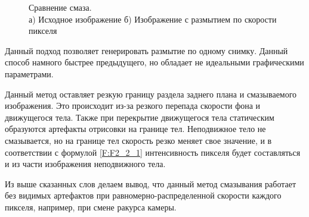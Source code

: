 \begin{figure}
    \centering
    \begin{minipage}[h]{0.49\linewidth}
    \end{minipage}
    \hfill
    \begin{minipage}[h]{0.49\linewidth}
    \end{minipage}
    \caption{Сравнение смаза. \cite{jimenez2014next} \\ а) Исходное изображение б) Изображение с размытием по скорости пикселя}
    \label{fig:pixel_blur}
\end{figure}


Данный подход позволяет генерировать размытие по одному снимку. Данный способ намного быстрее предыдущего, но обладает не идеальными графическими параметрами.
\par
Данный метод оставляет резкую границу раздела заднего плана и смазываемого изображения. Это происходит из-за резкого перепада скорости фона и движущегося тела. Также при перекрытие движущегося тела статическим образуются артефакты отрисовки на границе тел. Неподвижное тело не смазывается, но на границе тел скорость резко меняет свое значение, и в соответствии с формулой \eqref{F:F2_2_1} интенсивность пикселя будет составляться и из части изображения неподвижного тела.
\par
Из выше сказанных слов делаем вывод, что данный метод смазывания работает без видимых артефактов  при равномерно-распределенной скорости каждого пикселя, например, при смене ракурса камеры.

